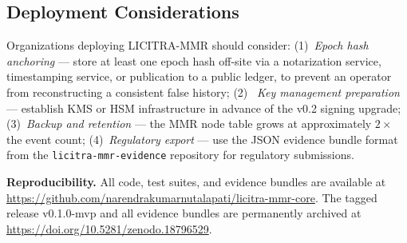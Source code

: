 \documentclass[sigconf,natbib=false]{acmart}
\begin{document}
\subsection{Deployment Considerations}

Organizations deploying LICITRA-MMR should consider: (1)~\textit{Epoch hash
anchoring} --- store at least one epoch hash off-site via a notarization
service, timestamping service, or publication to a public ledger, to
prevent an operator from reconstructing a consistent false history; (2)~%
\textit{Key management preparation} --- establish KMS or HSM infrastructure
in advance of the v0.2 signing upgrade; (3)~\textit{Backup and retention}
--- the MMR node table grows at approximately $2\times$ the event count;
(4)~\textit{Regulatory export} --- use the JSON evidence bundle format from
the \texttt{licitra-mmr-evidence} repository for regulatory submissions.

\textbf{Reproducibility.} All code, test suites, and evidence bundles are
available at \url{https://github.com/narendrakumarnutalapati/licitra-mmr-core}.
The tagged release v0.1.0-mvp and all evidence bundles are permanently
archived at \url{https://doi.org/10.5281/zenodo.18796529}.
\end{document}
